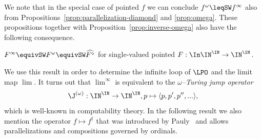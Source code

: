 \documentclass{lmcs}
\begin{document}
\noindent
We note that in the special case of pointed $f$ we can conclude $f^\omega\leqSW f^\infty$ also
from Propositions~\ref{prop:parallelization-diamond} and \ref{prop:omega}.
These propositions together with Proposition~\ref{prop:inverse-omega} also have the following consequence.

\begin{cor}
\label{cor:single-valued}
$F^\infty\equivSW F^\omega\equivSW\widehat{F^\diamond}$ for single-valued pointed $F:\In\IN^\IN\to\IN^\IN$.
\end{cor}

\noindent
We use this result in order to determine the infinite loop of $\LPO$ and the limit map $\lim$.
It turns out that $\lim^\infty$ is equivalent to the {\em $\omega$--Turing jump operator}
\[\J^{(\omega)}:\IN^\IN\to\IN^\IN,p\mapsto\langle p,p',p'',...\rangle,\]
which is well-known in computability theory.
In the following result we also mention the operator $f\mapsto f^\dagger$ that was introduced by Pauly~\cite{Pau15}
and allows parallelizations and compositions governed by ordinals.
\end{document}
